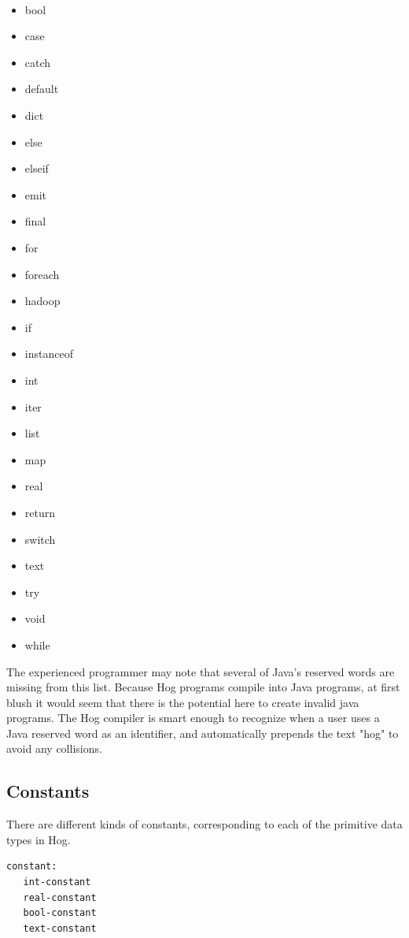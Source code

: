 \documentclass{article}
\begin{document}
\begin{multicols}{4}
\tt
\begin{itemize}
  \item[] bool
  \item[] case
  \item[] catch
  \item[] default
  \item[] dict
  \item[] else
  \item[] elseif
  \item[] emit
  \item[] final
  \item[] for
  \item[] foreach
  \item[] hadoop
  \item[] if
  \item[] instanceof
  \item[] int
  \item[] iter
  \item[] list
  \item[] map
  \item[] real
  \item[] return
  \item[] switch
  \item[] text
  \item[] try
  \item[] void
  \item[] while
\end{itemize}
\rm
\end{multicols}

The experienced programmer may note that several of Java's reserved words are missing from this list. Because Hog programs
compile into Java programs, at first blush it would seem that there is the potential here to create invalid java programs. The
Hog compiler is smart enough to recognize when a user uses a Java reserved word as an identifier, and automatically prepends
the text "hog" to avoid any collisions.


\subsection{Constants} %
\label{sub:constants}

There are different kinds of constants, corresponding to each of the primitive data types in Hog.

\begin{verbatim}
constant:
   int-constant
   real-constant
   bool-constant
   text-constant  
\end{verbatim}
\end{document}
